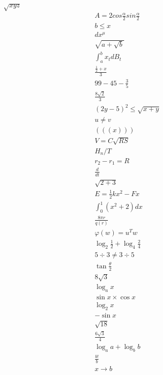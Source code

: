 \documentclass{article}
\begin{document}
$\sqrt{xyz}$
\begin{align}
	A=2cos\frac{\alpha}{2}sin\frac{\alpha}{2}\\
	b\leq x\\
	dx^{\mu}\\
	\sqrt{a + \sqrt{b}}\\
	\int_{a}^{b}x_{t}dB_{t}\\
	\frac{\frac{1}{2}+x}{3}\\
	99-45-\frac{3}{5}\\
	\frac{8\sqrt{2}}{3}\\
	(2y-5)^{2} \leq \sqrt{x+y}\\
	u \neq v\\
	(((x)))\\
	V=C\sqrt{RS}\\
	H_{n}\slash T\\
	r_{2}-r_{1}=R\\
	\frac{d}{dt}\\
	\sqrt{2+3}\\
	E=\frac{1}{2}kx^{2}-Fx\\
	\int_{0}^{1}(x^{2}+2)dx\\
	\frac{8\pi r}{q(r)}\\
	\varphi(w)=u^{T}w\\
	\log_{2}\frac{1}{2}+\log_{4}\frac{2}{4}\\
	5\div 3 \neq 3\div5\\
	\tan\frac{\theta}{2}\\
	8\sqrt{3}\\
	\log_{a}x\\
	\sin x\times \cos x\\
	\log_{2}x\\
	-\sin x\\
	\sqrt{18}\\
	\frac{6\sqrt{3}}{4}\\
	\log_{a}a+\log_{b}b\\
	\frac{b!}{b}\\
	x\rightarrow b\\
\end{align}
\newpage
\end{document}
